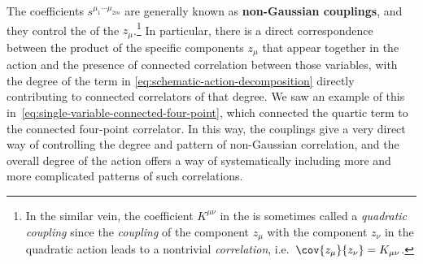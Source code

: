 The coefficients $s^{\mu_1 \cdots \mu_{2m}}$ are generally known as \textbf{non-Gaussian couplings}, and they control the  of the $z_\mu$.\footnote{
    In the similar vein, the coefficient $K^{\mu\nu}$ in the  is sometimes called a \emph{quadratic coupling} since the \emph{coupling} of the component $z_\mu$ with the component $z_\nu$ in the quadratic action leads to a nontrivial \emph{correlation}, i.e.~$\cov{z_\mu}{z_\nu} = K_{\mu\nu}$.
} In particular, there is a direct correspondence between the product of the specific components $z_\mu$ that appear together in the action and the presence of connected correlation between those variables, with the degree of the term in \eqref{eq:schematic-action-decomposition} directly contributing to connected correlators of that degree.
We saw an example of this in~\eqref{eq:single-variable-connected-four-point}, which connected the quartic term to the connected four-point correlator.
In this way, the couplings give a very direct way of controlling the degree and pattern of non-Gaussian correlation,
and the overall degree of the action offers a way of systematically including more and more complicated patterns of such correlations.





